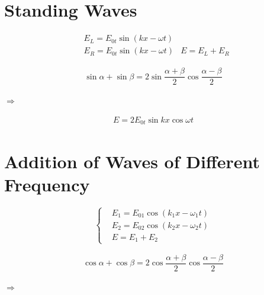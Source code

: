 \section{Standing Waves}

\begin{equation*}
  \begin{aligned}
    & E_L = E_{0t} \sin \left( k x - \omega t \right) \\
    & E_R = E_{0t} \sin \left( k x - \omega t \right)
    & E = E_L + E_R
  \end{aligned}
\end{equation*}

\begin{equation*}
  \begin{aligned}
    \sin \alpha + \sin \beta = 2 \sin \dfrac{\alpha + \beta}{2} \cos \dfrac{\alpha - \beta}{2}  
  \end{aligned}
\end{equation*}

$\Rightarrow$

\begin{equation*}
  \begin{aligned}
    E = 2 E_{0t} \sin kx \cos \omega t
  \end{aligned}
\end{equation*}

\section{Addition of Waves of Different Frequency}

\begin{equation*}
  \left\{
    \begin{aligned}
      & E_1 = E_{01} \cos \left( k_1 x - \omega_1 t \right) \\
      & E_2 = E_{02} \cos \left( k_2 x - \omega_2 t \right) \\
      & E = E_1 + E_2
    \end{aligned}
  \right.
\end{equation*}

\begin{equation*}
  \begin{aligned}
    \cos \alpha + \cos \beta = 2 \cos \dfrac{\alpha + \beta}{2} \cos \dfrac{\alpha - \beta}{2}  
  \end{aligned}
\end{equation*}



$\Rightarrow$

